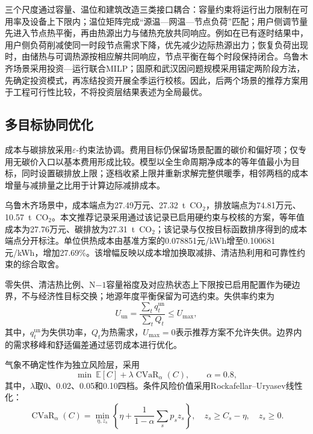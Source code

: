 三个尺度通过容量、温位和建筑改造三类接口耦合：容量约束将运行出力限制在可用率及设备上下限内；温位矩阵完成“源温---网温---节点负荷”匹配；用户侧调节量先进入节点热平衡，再由热源出力与储热充放共同响应。例如在已有逐时结果中，用户侧负荷削减使同一时段节点需求下降，优先减少边际热源出力；恢复负荷出现时，由储热与可调热源按相应解共同响应，节点平衡在每个时段保持闭合。乌鲁木齐场景采用投资---运行联合MILP；固原和武汉因问题规模采用锚定两阶段方法，先确定投资模式，再冻结投资开展全季运行校核。因此，后两个场景的推荐方案用于工程可行性比较，不将投资层结果表述为全局最优。

\subsection{多目标协同优化}\label{minor:multiobjective}

成本与碳排放采用$\varepsilon$-约束法协调。费用目标仍保留场景配置的碳价和偏好项；仅专用无碳价入口以基本费用形成比较。模型以全生命周期净成本的等年值最小为目标，同时设置碳排放上限；逐档收紧上限并重新求解完整供暖季，相邻两档的成本增量与减排量之比用于计算边际减排成本。

乌鲁木齐场景中，成本端点为27.49万元、27.32~t~CO$_2$，排放端点为74.81万元、10.57~t~CO$_2$。本文推荐记录采用通过该记录已启用硬约束与校核的方案，等年值成本为27.76万元、碳排放为27.31~t~CO$_2$；该记录与仅按目标函数排序得到的成本端点分开标注。单位供热成本由基准方案的0.078851元/kWh增至0.100681元/kWh，增加27.69\%。该增幅反映以成本增加换取减排、清洁热利用和可靠性约束的综合取舍。

零失供、清洁热比例、N$-1$容量裕度及对应热状态上下限按已启用配置作为硬边界，不与经济性目标交换；地源年度平衡保留为可选约束。失供率约束为
\begin{equation}
U_{\mathrm{un}}=\frac{\sum_t q_t^{\mathrm{un}}}{\sum_t Q_t}\leq U_{\max},
\label{eq:alg-unserved}
\end{equation}
其中，$q_t^{\mathrm{un}}$为失供功率，$Q_t$为热需求，$U_{\max}=0$表示推荐方案不允许失供。边界内的需求移峰和舒适偏差通过惩罚成本进行优化。

气象不确定性作为独立风险层，采用
\begin{equation}
\min\ \mathbb{E}[C]+\lambda\operatorname{CVaR}_{\alpha}(C),
\qquad \alpha=0.8,
\label{eq:alg-risk-objective}
\end{equation}
其中，$\lambda$取0、0.02、0.05和0.10四档。条件风险价值采用Rockafellar--Uryasev线性化：
\begin{equation}
\operatorname{CVaR}_{\alpha}(C)=\min_{\eta,z_s}\left\{\eta+\frac{1}{1-\alpha}\sum_s p_sz_s\right\},
\quad z_s\geq C_s-\eta,\quad z_s\geq0.
\label{eq:alg-cvar}
\end{equation}

